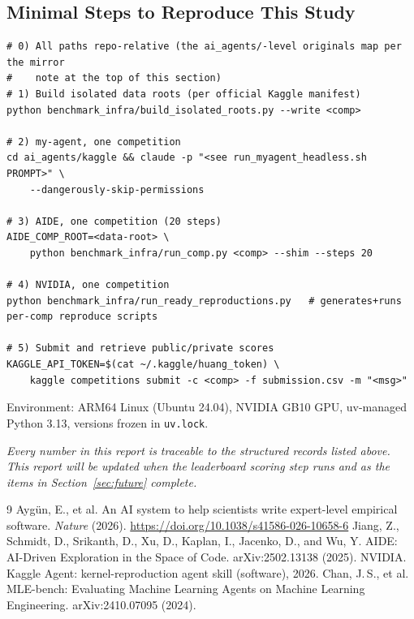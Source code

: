 \documentclass[11pt,a4paper]{article}
\begin{document}
\subsection{Minimal Steps to Reproduce This Study}

\begin{verbatim}
# 0) All paths repo-relative (the ai_agents/-level originals map per the mirror
#    note at the top of this section)
# 1) Build isolated data roots (per official Kaggle manifest)
python benchmark_infra/build_isolated_roots.py --write <comp>

# 2) my-agent, one competition
cd ai_agents/kaggle && claude -p "<see run_myagent_headless.sh PROMPT>" \
    --dangerously-skip-permissions

# 3) AIDE, one competition (20 steps)
AIDE_COMP_ROOT=<data-root> \
    python benchmark_infra/run_comp.py <comp> --shim --steps 20

# 4) NVIDIA, one competition
python benchmark_infra/run_ready_reproductions.py   # generates+runs per-comp reproduce scripts

# 5) Submit and retrieve public/private scores
KAGGLE_API_TOKEN=$(cat ~/.kaggle/huang_token) \
    kaggle competitions submit -c <comp> -f submission.csv -m "<msg>"
\end{verbatim}

Environment: ARM64 Linux (Ubuntu 24.04), NVIDIA GB10 GPU, uv-managed Python 3.13, versions frozen in \texttt{uv.lock}.

\vspace{1em}
\noindent\emph{Every number in this report is traceable to the structured records listed above. This report will be updated when the leaderboard scoring step runs and as the items in Section~\ref{sec:future} complete.}


\begin{thebibliography}{9}
 Ayg\"un, E., et al. An AI system to help scientists write expert-level empirical software. \emph{Nature} (2026). \url{https://doi.org/10.1038/s41586-026-10658-6}
 Jiang, Z., Schmidt, D., Srikanth, D., Xu, D., Kaplan, I., Jacenko, D., and Wu, Y. AIDE: AI-Driven Exploration in the Space of Code. arXiv:2502.13138 (2025).
\bibitem{nvidia2026} NVIDIA. Kaggle Agent: kernel-reproduction agent skill (software), 2026.
\bibitem{mlebench} Chan, J.\,S., et al. MLE-bench: Evaluating Machine Learning Agents on Machine Learning Engineering. arXiv:2410.07095 (2024).
\end{thebibliography}
\end{document}
